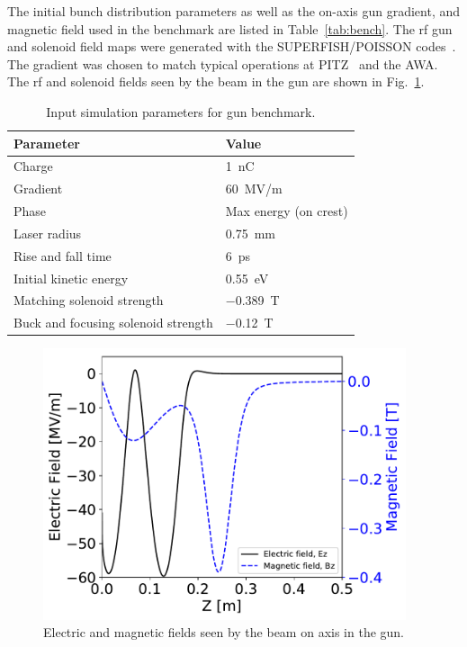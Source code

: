 \documentclass{iitthesis}
\begin{document}
The initial bunch distribution parameters as well as the 
on-axis gun gradient, and magnetic field used in 
the benchmark are listed in Table~\ref{tab:bench}. 
The rf gun and solenoid field maps were generated 
with the SUPERFISH/POISSON  codes~\cite{superfish}.
The gradient was chosen to match typical operations at PITZ~\cite{pitz}
and the AWA. The rf and solenoid fields seen by the beam in the gun are shown in Fig.~\ref{fig:gunfields}.
\begin{table}
	\begin{center}
		\begin{tabular}{l l} 
			\toprule
			\textbf{Parameter} & \textbf{Value} \\ 
			\midrule
			Charge & \SI{1}{nC} \\
			\addlinespace[-1em] 
			Gradient & \SI{60}{MV/m} \\
			\addlinespace[-1em] 
			Phase & Max energy (on crest) \\
			\addlinespace[-1em] 
			Laser radius & \SI{0.75}{mm} \\
			\addlinespace[-1em] 
			Rise and fall time & \SI{6}{ps} \\
			\addlinespace[-1em] 
			Initial kinetic energy & \SI{0.55}{eV} \\
			\addlinespace[-1em] 
			Matching solenoid strength & \SI{-0.389}{T} \\
			\addlinespace[-1em] 
			Buck and focusing solenoid strength & \SI{-0.12}{T} \\
			\bottomrule			
		\end{tabular}
	\end{center}
	\caption{Input simulation parameters for gun benchmark.}
\end{table}\label{tab:bench}
\begin{figure}
	\begin{center}
		\includegraphics[width=0.95\textwidth]{images/gun_EM_fields}\caption{Electric and magnetic fields seen by the beam on axis in the gun.}
	\end{center}
	\label{fig:gunfields}
\end{figure}
\end{document}
